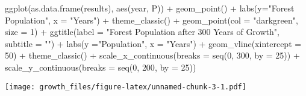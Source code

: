 \documentclass[
]{article}
\newenvironment{Shaded}{\begin{snugshade}}{\end{snugshade}}
\newcommand{\AttributeTok}[1]{\textcolor[rgb]{0.77,0.63,0.00}{#1}}
\newcommand{\DecValTok}[1]{\textcolor[rgb]{0.00,0.00,0.81}{#1}}
\newcommand{\FunctionTok}[1]{\textcolor[rgb]{0.00,0.00,0.00}{#1}}
\newcommand{\NormalTok}[1]{#1}
\newcommand{\SpecialCharTok}[1]{\textcolor[rgb]{0.00,0.00,0.00}{#1}}
\newcommand{\StringTok}[1]{\textcolor[rgb]{0.31,0.60,0.02}{#1}}
\begin{document}
\begin{Shaded}
\begin{Highlighting}[]
\FunctionTok{ggplot}\NormalTok{(}\FunctionTok{as.data.frame}\NormalTok{(results), }\FunctionTok{aes}\NormalTok{(year, P)) }\SpecialCharTok{+} 
  \FunctionTok{geom\_point}\NormalTok{() }\SpecialCharTok{+} 
  \FunctionTok{labs}\NormalTok{(}\AttributeTok{y=}\StringTok{"Forest Population"}\NormalTok{, }
       \AttributeTok{x =} \StringTok{"Years"}\NormalTok{) }\SpecialCharTok{+}
  \FunctionTok{theme\_classic}\NormalTok{() }\SpecialCharTok{+}
\FunctionTok{geom\_point}\NormalTok{(}\AttributeTok{col =} \StringTok{"darkgreen"}\NormalTok{,}
             \AttributeTok{size =} \DecValTok{1}\NormalTok{) }\SpecialCharTok{+} 
  \FunctionTok{ggtitle}\NormalTok{(}\AttributeTok{label =} \StringTok{"Forest Population after 300 Years of Growth"}\NormalTok{,}
          \AttributeTok{subtitle =} \StringTok{""}\NormalTok{) }\SpecialCharTok{+}
  \FunctionTok{labs}\NormalTok{(}\AttributeTok{y =}\StringTok{"Population"}\NormalTok{, }
       \AttributeTok{x =} \StringTok{"Years"}\NormalTok{) }\SpecialCharTok{+} 
  \FunctionTok{geom\_vline}\NormalTok{(}\AttributeTok{xintercept =} \DecValTok{50}\NormalTok{) }\SpecialCharTok{+}
  \FunctionTok{theme\_classic}\NormalTok{() }\SpecialCharTok{+}
  \FunctionTok{scale\_x\_continuous}\NormalTok{(}\AttributeTok{breaks =} \FunctionTok{seq}\NormalTok{(}\DecValTok{0}\NormalTok{, }\DecValTok{300}\NormalTok{, }\AttributeTok{by =} \DecValTok{25}\NormalTok{)) }\SpecialCharTok{+}
  \FunctionTok{scale\_y\_continuous}\NormalTok{(}\AttributeTok{breaks =} \FunctionTok{seq}\NormalTok{(}\DecValTok{0}\NormalTok{, }\DecValTok{200}\NormalTok{, }\AttributeTok{by =} \DecValTok{25}\NormalTok{))}
\end{Highlighting}
\end{Shaded}

\texttt{[image: growth\_files/figure-latex/unnamed-chunk-3-1.pdf]}
\end{document}
